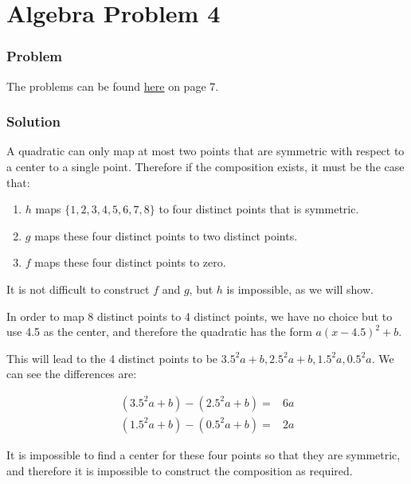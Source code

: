 \section*{Algebra Problem 4}
\subsubsection*{Problem}
The problems can be found \href{https://www.math.hkust.edu.hk/~makyli/190_2010Sp/problemBk.pdf}{here} on page 7.

\subsubsection*{Solution}
A quadratic can only map at most two points that are symmetric with respect to a center to a single point. Therefore if the composition exists, it must be the case that:

\begin{enumerate}
    \item{ $ h $ maps $ \{1, 2, 3, 4, 5, 6, 7, 8\}$ to four distinct points that is symmetric. }
    \item{ $ g $ maps these four distinct points to two distinct points. }
    \item{ $ f $ maps these four distinct points to zero. }
\end{enumerate}

It is not difficult to construct $ f $ and $ g $, but $ h $ is impossible, as we will show.

In order to map 8 distinct points to 4 distinct points, we have no choice but to use 4.5 as the center, and therefore the quadratic has the form $ a(x - 4.5)^2 + b $.

This will lead to the 4 distinct points to be $ 3.5^2 a + b, 2.5^2a + b, 1.5^2a, 0.5^2a $. We can see the differences are:

\begin{eqnarray*}
    (3.5^2 a + b) - (2.5^2a + b) =& 6a \\
    (1.5^2 a + b) - (0.5^2a + b) =& 2a
\end{eqnarray*}

It is impossible to find a center for these four points so that they are symmetric, and therefore it is impossible to construct the composition as required.